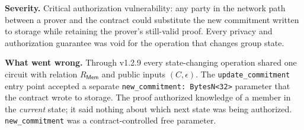 \documentclass{IEEEcsmag}
\newcommand{\Rmem}{R_{\mathsf{Mem}}}
\begin{document}
\textbf{Severity.} Critical authorization vulnerability: any party in the network path between a prover and the contract could substitute the new commitment written to storage while retaining the prover's still-valid proof. Every privacy and authorization guarantee was void for the operation that changes group state.

\textbf{What went wrong.} Through v1.2.9 every state-changing operation shared one circuit with relation $\Rmem$ and public inputs $(C, \epsilon)$. The \texttt{update\_commitment} entry point accepted a separate \texttt{new\_commitment: BytesN<32>} parameter that the contract wrote to storage. The proof authorized knowledge of a member in the \emph{current} state; it said nothing about which next state was being authorized. \texttt{new\_commitment} was a contract-controlled free parameter.
\end{document}
